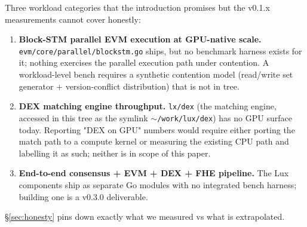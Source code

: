Three workload categories that the introduction promises but the
v0.1.x measurements cannot cover honestly:
\begin{enumerate}[nosep,leftmargin=2em]
\item \textbf{Block-STM parallel EVM execution at GPU-native scale.}
\texttt{evm/core/parallel/blockstm.go} ships, but no benchmark
harness exists for it; nothing exercises the parallel execution
path under contention. A workload-level bench requires a synthetic
contention model (read/write set generator + version-conflict
distribution) that is not in tree.

\item \textbf{DEX matching engine throughput.}
\texttt{lx/dex} (the matching engine, accessed in this tree as the
symlink \texttt{$\sim$/work/lux/dex}) has no GPU surface today.
Reporting "DEX on GPU" numbers would require either porting the
match path to a compute kernel or measuring the existing CPU path
and labelling it as such; neither is in scope of this paper.

\item \textbf{End-to-end consensus + EVM + DEX + FHE pipeline.}
The Lux components ship as separate Go modules with no integrated
bench harness; building one is a v0.3.0 deliverable.
\end{enumerate}

\S\ref{sec:honesty} pins down exactly what we measured vs what is
extrapolated.

